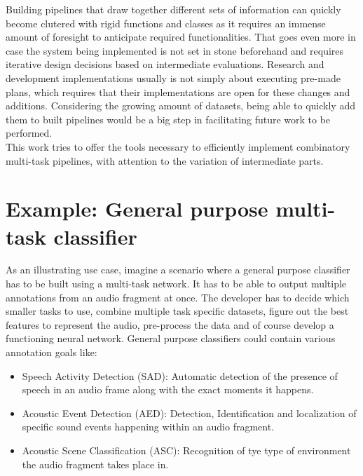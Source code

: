 Building pipelines that draw together different sets of information can quickly become clutered with rigid functions and classes as it requires an immense amount of foresight to anticipate required functionalities. That goes even more in case the system being implemented is not set in stone beforehand and requires iterative design decisions based on intermediate evaluations. Research and development implementations usually is not simply about executing pre-made plans, which requires that their implementations are open for these changes and additions. Considering the growing amount of datasets, being able to quickly add them to built pipelines would be a big step in facilitating future work to be performed.\\

This work tries to offer the tools necessary to efficiently implement combinatory multi-task pipelines, with attention to the variation of intermediate parts. \\

\section{Example: General purpose multi-task classifier}

As an illustrating use case, imagine a scenario where a general purpose classifier has to be built using a multi-task network. It has to be able to output multiple annotations from an audio fragment at once. The developer has to decide which smaller tasks to use, combine multiple task specific datasets, figure out the best features to represent the audio, pre-process the data and of course develop a functioning neural network. General purpose classifiers could contain various annotation goals like:\\

\begin{itemize}
	\item Speech Activity Detection (SAD): Automatic detection of the presence of speech in an audio frame along with the exact moments it happens.
	\item Acoustic Event Detection (AED): Detection, Identification and localization of specific sound events happening within an audio fragment.
	\item Acoustic Scene Classification (ASC): Recognition of tye type of environment the audio fragment takes place in. 
\end{itemize}

